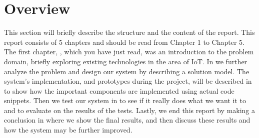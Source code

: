 \section{Overview}\label{sec:overview}
This section will briefly describe the structure and the content of the report. 
This report consists of 5 chapters and should be read from Chapter 1 to Chapter 5. 
The first chapter, , which you have just read, was an introduction to the problem domain, 
briefly exploring existing technologies in the area of IoT. 
In  we further analyze the problem and design our system by describing a solution model. 
The system's implementation, and prototypes during the project, 
will be described in  to show how the important components are implemented using actual code snippets. 
Then we test our system in  to see if it really does what we want it to and to evaluate on the results of the tests. 
Lastly, we end this report by making a conclusion in  where we show the final results, 
and then discuss these results and how the system may be further improved. 
